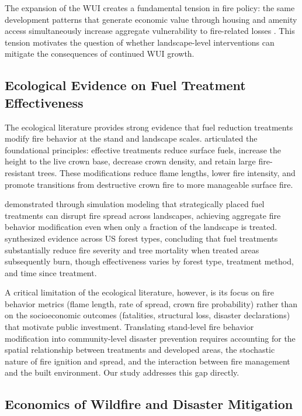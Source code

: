 \documentclass[12pt, letterpaper]{article}
\begin{document}
The expansion of the WUI creates a fundamental tension in fire policy: the same development patterns that generate economic value through housing and amenity access simultaneously increase aggregate vulnerability to fire-related losses \citep{syphard2017}. This tension motivates the question of whether landscape-level interventions can mitigate the consequences of continued WUI growth.

\subsection{Ecological Evidence on Fuel Treatment Effectiveness}

The ecological literature provides strong evidence that fuel reduction treatments modify fire behavior at the stand and landscape scales. \citet{agee2005} articulated the foundational principles: effective treatments reduce surface fuels, increase the height to the live crown base, decrease crown density, and retain large fire-resistant trees. These modifications reduce flame lengths, lower fire intensity, and promote transitions from destructive crown fire to more manageable surface fire.

\citet{finney2001} demonstrated through simulation modeling that strategically placed fuel treatments can disrupt fire spread across landscapes, achieving aggregate fire behavior modification even when only a fraction of the landscape is treated. \citet{stephens2012} synthesized evidence across US forest types, concluding that fuel treatments substantially reduce fire severity and tree mortality when treated areas subsequently burn, though effectiveness varies by forest type, treatment method, and time since treatment.

A critical limitation of the ecological literature, however, is its focus on fire behavior metrics (flame length, rate of spread, crown fire probability) rather than on the socioeconomic outcomes (fatalities, structural loss, disaster declarations) that motivate public investment. Translating stand-level fire behavior modification into community-level disaster prevention requires accounting for the spatial relationship between treatments and developed areas, the stochastic nature of fire ignition and spread, and the interaction between fire management and the built environment. Our study addresses this gap directly.

\subsection{Economics of Wildfire and Disaster Mitigation}
\end{document}
